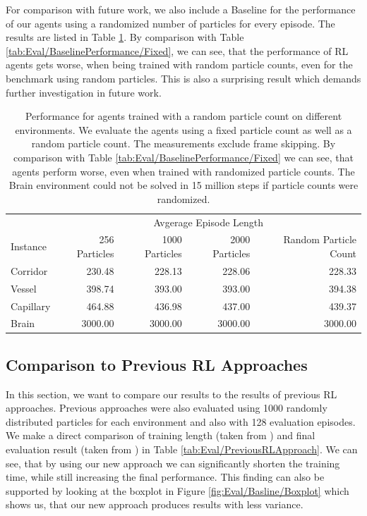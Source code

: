 For comparison with future work, we also include a Baseline for the performance of our agents using a randomized number of particles for every episode. The results are listed in Table \ref{tab:Eval/BaselinePerformance/RPC}. By comparison with Table \ref{tab:Eval/BaselinePerformance/Fixed}, we can see, that the performance of RL agents gets worse, when being trained with random particle counts, even for the benchmark using random particles. This is also a surprising result which demands further investigation in future work. 

\begin{table} [htp]
    \begin{center}
        \begin{tabular}{lrrrr}
            \toprule
            & \multicolumn{4}{c}{Avgerage Episode Length} \\
            \cmidrule(lr){2-5}
            Instance & 256 Particles & 1000 Particles & 2000 Particles & Random Particle Count \\
            \midrule
            Corridor & 230.48 & 228.13 & 228.06 & 228.33 \\
            Vessel & 398.74 & 393.00 & 393.00 & 394.38 \\
            Capillary & 464.88 & 436.98 & 437.00 & 439.37 \\
            Brain & 3000.00 & 3000.00 & 3000.00 & 3000.00  \\
            \bottomrule
        \end{tabular}

    \end{center}
    \caption[Baseline Performance for Agents Trained with a Random Particle Count]{Performance for agents trained with a random particle count on different environments. We evaluate the agents using a fixed particle count as well as a random particle count. The measurements exclude frame skipping. By comparison with Table \ref{tab:Eval/BaselinePerformance/Fixed} we can see, that agents perform worse, even when trained with randomized particle counts. The Brain environment could not be solved in 15 million steps if particle counts were randomized.} \label{tab:Eval/BaselinePerformance/RPC}
\end{table}


\subsection{Comparison to Previous RL Approaches} \label{sec:EvalRLComparison}
In this section, we want to compare our results to the results of previous RL approaches. Previous approaches were also evaluated using 1000 randomly distributed particles for each environment and also with 128 evaluation episodes. We make a direct comparison of training length (taken from \cite{huang2019}) and final evaluation result (taken from \cite{becker2020}) in Table \ref{tab:Eval/PreviousRLApproach}. We can see, that by using our new approach we can significantly shorten the training time, while still increasing the final performance. This finding can also be supported by looking at the boxplot in Figure \ref{fig:Eval/Basline/Boxplot} which shows us, that our new approach produces results with less variance. 

